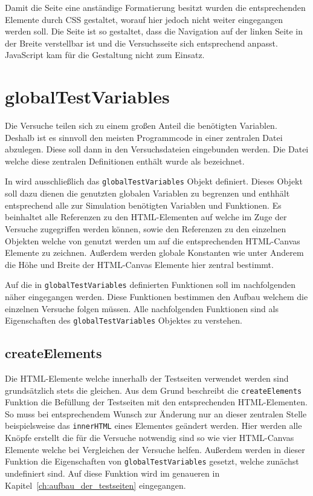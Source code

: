 Damit die Seite eine anständige Formatierung besitzt wurden die entsprechenden Elemente durch CSS gestaltet, worauf hier jedoch nicht weiter eingegangen werden soll.
Die Seite ist so gestaltet, dass die Navigation auf der linken Seite in der Breite verstellbar ist und die Versuchsseite sich entsprechend anpasst.
JavaScript kam für die Gestaltung nicht zum Einsatz.

\section{globalTestVariables}\label{ch:simulation_js}

Die Versuche teilen sich zu einem gro{\ss}en Anteil die benötigten Variablen.
Deshalb ist es sinnvoll den meisten Programmcode in einer zentralen Datei abzulegen.
Diese soll dann in den Versuchsdateien eingebunden werden.
Die Datei welche diese zentralen Definitionen enthält wurde als  bezeichnet.

In  wird ausschlie{\ss}lich das \lstinline{globalTestVariables} Objekt definiert.
Dieses Objekt soll dazu dienen die genutzten globalen Variablen zu begrenzen und enthhält entsprechend alle zur Simulation benötigten Variablen und Funktionen.
Es beinhaltet alle Referenzen zu den HTML-Elementen auf welche im Zuge der Versuche zugegriffen werden können, sowie den Referenzen zu den einzelnen  Objekten welche von  genutzt werden um auf die entsprechenden HTML-Canvas Elemente zu zeichnen.
Au{\ss}erdem werden globale Konstanten wie unter Anderem die Höhe und Breite der HTML-Canvas Elemente hier zentral bestimmt.

Auf die in \lstinline{globalTestVariables} definierten Funktionen soll im nachfolgenden näher eingegangen werden.
Diese Funktionen bestimmen den Aufbau welchem die einzelnen Versuche folgen müssen.
Alle nachfolgenden Funktionen sind als Eigenschaften des \lstinline{globalTestVariables} Objektes zu verstehen.

\subsection{createElements}\label{ch:gtv_createElements}

Die HTML-Elemente welche innerhalb der Testseiten verwendet werden sind grundsätzlich stets die gleichen.
Aus dem Grund beschreibt die \lstinline{createElements} Funktion die Befüllung der Testseiten mit den entsprechenden HTML-Elementen.
So muss bei entsprechendem Wunsch zur Änderung nur an dieser zentralen Stelle beispielsweise das \lstinline{innerHTML} eines Elementes geändert werden.
Hier werden alle Knöpfe erstellt die für die Versuche notwendig sind so wie vier HTML-Canvas Elemente welche bei Vergleichen der Versuche helfen.
Au{\ss}erdem werden in dieser Funktion die Eigenschaften von \lstinline{globalTestVariables} gesetzt, welche zunächst undefiniert sind.
Auf diese Funktion wird im genaueren in Kapitel~\ref{ch:aufbau_der_testseiten} eingegangen.

